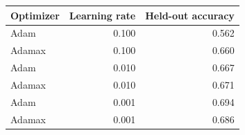 \begin{tabular}{lrr}
\toprule
Optimizer & Learning rate & Held-out accuracy \\
\midrule
Adam & 0.100 & 0.562 \\
Adamax & 0.100 & 0.660 \\
Adam & 0.010 & 0.667 \\
Adamax & 0.010 & 0.671 \\
Adam & 0.001 & 0.694 \\
Adamax & 0.001 & 0.686 \\
\bottomrule
\end{tabular}
